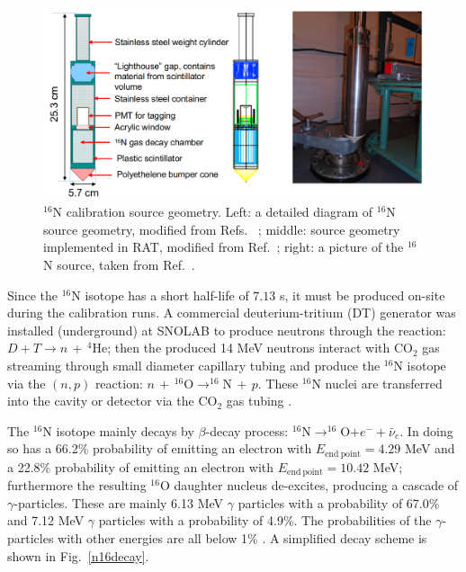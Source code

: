 \begin{figure}[!htb]
	\centering
	\includegraphics[width=12cm]{n16geom.png}
	\caption[$^{16}$N calibration source geometry.]{$^{16}$N calibration source geometry. Left: a detailed diagram of $^{16}$N source geometry, modified from Refs.~ \cite{maclellan2009energy,matt_deployedsource}; middle: source geometry implemented in RAT, modified from Ref.~\cite{n16geom_zach}; right: a picture of the $^{16}$N source, taken from Ref.~\cite{n16pic}.}
	\label{n16pic}
\end{figure}

Since the $^{16}$N isotope has a short half-life of $7.13$ s, it must be produced on-site during the calibration runs. A commercial deuterium-tritium (DT) generator was installed (underground) at SNOLAB to produce neutrons through the reaction: $D+T\to n \, + \, ^{4}$He; then the produced 14 MeV neutrons interact with CO$_2$ gas streaming through small diameter capillary tubing and produce the $^{16}$N isotope via the $(n,p)$ reaction: $n \, + \, ^{16}\mathrm{O} \to ^{16}\mathrm{N} \, + \,p$. These $^{16}$N nuclei are transferred into the cavity or detector via the CO$_2$ gas tubing \cite{dragowsky200216n}.

The $^{16}$N isotope mainly decays by $\beta$-decay process: $^{16}$N$\to ^{16}$O$+e^-+\bar{\nu}_e$. In doing so has a 66.2\% probability of emitting an electron with $E_{\mathrm{end~point}}=4.29$ MeV and a 22.8\% probability of emitting an electron with $E_{\mathrm{end~point}}=10.42$ MeV; furthermore the resulting $^{16}$O daughter nucleus de-excites, producing a cascade of $\gamma$-particles. These are mainly 6.13 MeV $\gamma$ particles with a probability of 67.0\% and 7.12 MeV $\gamma$ particles with a probability of 4.9\%. The probabilities of the $\gamma$-particles with other energies are all below 1\% \cite{nndc}. A simplified decay scheme is shown in Fig.~\ref{n16decay}.

